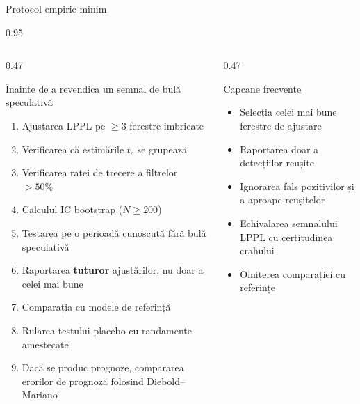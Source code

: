 \documentclass[9pt, aspectratio=169, t]{beamer}
\begin{document}
\begin{frame}{Protocol empiric minim}
    \begin{cminipage}{0.95\textwidth}
    {\scriptsize
    \begin{columns}[T]
        \begin{column}{0.47\textwidth}
            \begin{exampleblock}{Înainte de a revendica un semnal de bulă speculativă}
                \begin{enumerate}\setlength{\itemsep}{1pt}
                    \item Ajustarea LPPL pe $\geq 3$ ferestre imbricate
                    \item Verificarea că estimările $t_c$ se grupează
                    \item Verificarea ratei de trecere a filtrelor $> 50\%$
                    \item Calculul IC bootstrap ($N \geq 200$)
                    \item Testarea pe o perioadă cunoscută fără bulă speculativă
                    \item Raportarea \textbf{tuturor} ajustărilor, nu doar a celei mai bune
                    \item Comparația cu modele de referință
                    \item Rularea testului placebo cu randamente amestecate
                    \item Dacă se produc prognoze, compararea erorilor de prognoză folosind Diebold--Mariano
                \end{enumerate}
            \end{exampleblock}
        \end{column}
        \begin{column}{0.47\textwidth}
            \begin{alertblock}{Capcane frecvente}
                \begin{itemize}\setlength{\itemsep}{1pt}
                    \item Selecția celei mai bune ferestre de ajustare
                    \item Raportarea doar a detecțiilor reușite
                    \item Ignorarea fals pozitivilor și a aproape-reușitelor
                    \item Echivalarea semnalului LPPL cu certitudinea crahului
                    \item Omiterea comparației cu referințe

\end{itemize}
\end{alertblock}
\end{column}
\end{columns}}
\end{cminipage}
\end{frame}
\end{document}

